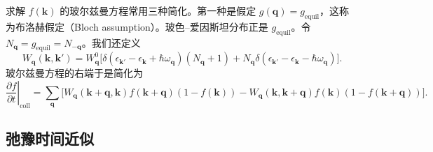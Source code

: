 求解 $f(\mathbf{k})$ 的玻尔兹曼方程常用三种简化。第一种是假定 $g(\mathbf{q})=g_{\mathrm{equil}}$，这称为布洛赫假定（Bloch assumption）。玻色–爱因斯坦分布正是 $g_{\mathrm{equil}}$。令 $N_{\mathbf{q}}=g_{\mathrm{equil}}=N_{-\mathbf{q}}$。我们还定义
\begin{equation*}
W_{\mathbf{q}}(\mathbf{k},\mathbf{k}')=W^0_{\mathbf{q}}\bigl[\delta(\epsilon_{\mathbf{k}'}-\epsilon_{\mathbf{k}}+\hbar\omega_{\mathbf{q}})(N_{\mathbf{q}}+1)+N_{\mathbf{q}}\delta(\epsilon_{\mathbf{k}'}-\epsilon_{\mathbf{k}}-\hbar\omega_{\mathbf{q}})\bigr].
\end{equation*}
玻尔兹曼方程的右端于是简化为
\begin{equation*}
\left.\frac{\partial f}{\partial t}\right|_{\mathrm{coll}}=\sum_{\mathbf{q}}\bigl[W_{\mathbf{q}}(\mathbf{k}+\mathbf{q},\mathbf{k})f(\mathbf{k}+\mathbf{q})(1-f(\mathbf{k}))-W_{\mathbf{q}}(\mathbf{k},\mathbf{k}+\mathbf{q})f(\mathbf{k})(1-f(\mathbf{k}+\mathbf{q}))\bigr].\tag{11.70}
\end{equation*}

\subsection{弛豫时间近似}

